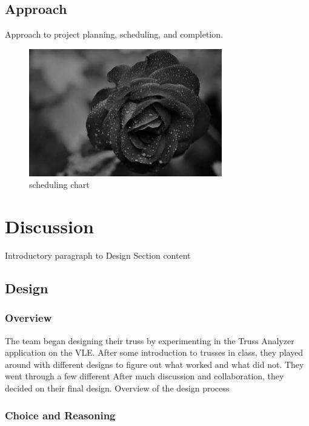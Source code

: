 \documentclass{article}
\let\Oldsection\section
\renewcommand{\section}{\FloatBarrier\Oldsection}
\let\Oldsubsection\subsection
\renewcommand{\subsection}{\FloatBarrier\Oldsubsection}
\let\Oldsubsubsection\subsubsection
\renewcommand{\subsubsection}{\FloatBarrier\Oldsubsubsection}
\begin{document}
  \subsection{Approach}
  
  Approach to project planning, scheduling, and completion.
  
  \begin{figure}[!htb]
    \centering
    \includegraphics[width=0.75\textwidth]{assets/logo.png}
    \caption{scheduling chart}
    \label{fig:spacesuitdisplay}
  \end{figure}
  
  \newpage
  
  \section{Discussion}
  
  Introductory paragraph to Design Section content
  
  \subsection{Design}
  
  \subsubsection{Overview}
  
  The team began designing their truss by experimenting in the Truss Analyzer application on the VLE. After some introduction to trusses in class, they played around with different designs to figure out what worked and what did not. They went through a few different  After much discussion and collaboration, they decided on their final design.
  Overview of the design process
  
  \subsubsection{Choice and Reasoning}
  
\end{document}
